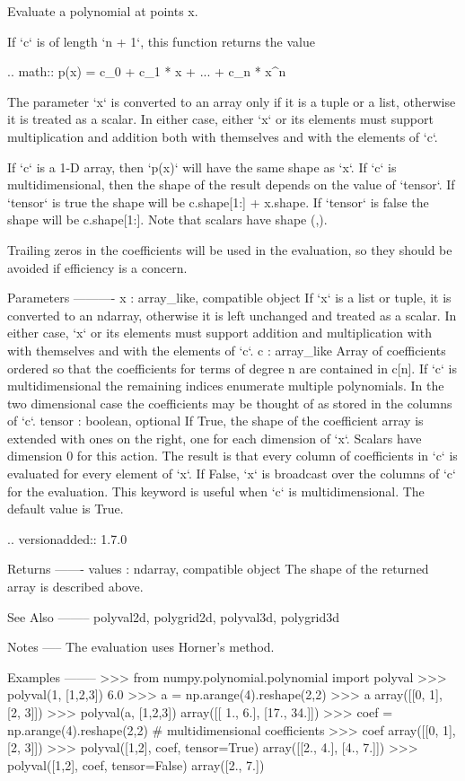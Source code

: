 \begin{DoxyVerb}Evaluate a polynomial at points x.

If `c` is of length `n + 1`, this function returns the value

.. math:: p(x) = c_0 + c_1 * x + ... + c_n * x^n

The parameter `x` is converted to an array only if it is a tuple or a
list, otherwise it is treated as a scalar. In either case, either `x`
or its elements must support multiplication and addition both with
themselves and with the elements of `c`.

If `c` is a 1-D array, then `p(x)` will have the same shape as `x`.  If
`c` is multidimensional, then the shape of the result depends on the
value of `tensor`. If `tensor` is true the shape will be c.shape[1:] +
x.shape. If `tensor` is false the shape will be c.shape[1:]. Note that
scalars have shape (,).

Trailing zeros in the coefficients will be used in the evaluation, so
they should be avoided if efficiency is a concern.

Parameters
----------
x : array_like, compatible object
    If `x` is a list or tuple, it is converted to an ndarray, otherwise
    it is left unchanged and treated as a scalar. In either case, `x`
    or its elements must support addition and multiplication with
    with themselves and with the elements of `c`.
c : array_like
    Array of coefficients ordered so that the coefficients for terms of
    degree n are contained in c[n]. If `c` is multidimensional the
    remaining indices enumerate multiple polynomials. In the two
    dimensional case the coefficients may be thought of as stored in
    the columns of `c`.
tensor : boolean, optional
    If True, the shape of the coefficient array is extended with ones
    on the right, one for each dimension of `x`. Scalars have dimension 0
    for this action. The result is that every column of coefficients in
    `c` is evaluated for every element of `x`. If False, `x` is broadcast
    over the columns of `c` for the evaluation.  This keyword is useful
    when `c` is multidimensional. The default value is True.

    .. versionadded:: 1.7.0

Returns
-------
values : ndarray, compatible object
    The shape of the returned array is described above.

See Also
--------
polyval2d, polygrid2d, polyval3d, polygrid3d

Notes
-----
The evaluation uses Horner's method.

Examples
--------
>>> from numpy.polynomial.polynomial import polyval
>>> polyval(1, [1,2,3])
6.0
>>> a = np.arange(4).reshape(2,2)
>>> a
array([[0, 1],
       [2, 3]])
>>> polyval(a, [1,2,3])
array([[ 1.,   6.],
       [17.,  34.]])
>>> coef = np.arange(4).reshape(2,2) # multidimensional coefficients
>>> coef
array([[0, 1],
       [2, 3]])
>>> polyval([1,2], coef, tensor=True)
array([[2.,  4.],
       [4.,  7.]])
>>> polyval([1,2], coef, tensor=False)
array([2.,  7.])\end{DoxyVerb}
